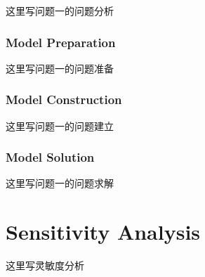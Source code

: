 \documentclass{apmcmthesis}                                             %
\begin{document}
这里写问题一的问题分析



\subsubsection{Model Preparation}

这里写问题一的问题准备



\subsubsection{Model Construction}

这里写问题一的问题建立



\subsubsection{Model Solution}

这里写问题一的问题求解















\newpage
\section{Sensitivity Analysis}
这里写灵敏度分析

\end{document}

